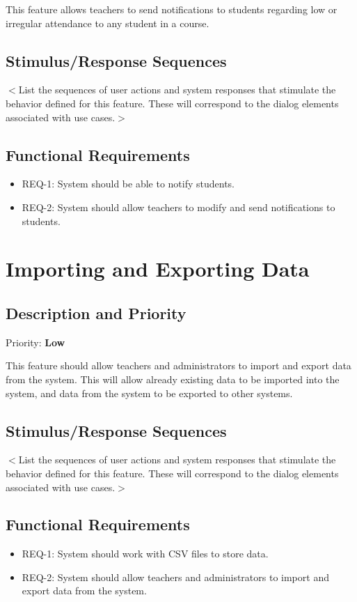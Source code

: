 \documentclass{scrreprt}
\begin{document}
This feature allows teachers to send notifications to students regarding low or irregular attendance to any student in a course.
\subsection{Stimulus/Response Sequences}
$<$List the sequences of user actions and system responses that stimulate the 
behavior defined for this feature. These will correspond to the dialog elements 
associated with use cases.$>$

\subsection{Functional Requirements}
\begin{itemize}
    \item REQ-1: System should be able to notify students.
\item REQ-2: System should allow teachers to modify and send notifications to students.
\end{itemize}

\section{Importing and Exporting Data}
\subsection{Description and Priority}
Priority: \textbf{Low}

This feature should allow teachers and administrators to import and export data from the system.
This will allow already existing data to be imported into the system, and data from the system to be exported to other systems.
\subsection{Stimulus/Response Sequences}
$<$List the sequences of user actions and system responses that stimulate the 
behavior defined for this feature. These will correspond to the dialog elements 
associated with use cases.$>$

\subsection{Functional Requirements}
\begin{itemize}
    \item REQ-1: System should work with CSV files to store data.
    \item REQ-2: System should allow teachers and administrators to import and export data from the system.
\end{itemize}
\end{document}
